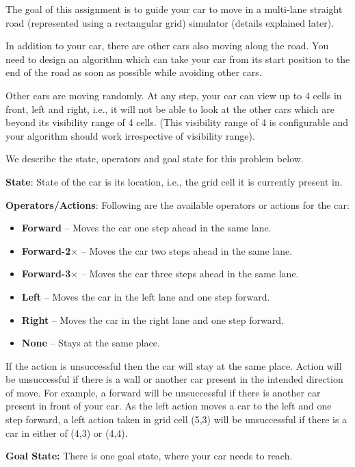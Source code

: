 \documentclass[12pt, letterpaper]{article}
\begin{document}
The goal of this assignment is to guide your car to move in a multi-lane straight road (represented using a rectangular grid) simulator (details explained later). 

In addition to your car, there are other cars also moving along the road. You need to design an algorithm which can take your car from its start position to the end of the road as soon as possible while avoiding other cars. 

Other cars are moving randomly. At any step, your car can view up to 4 cells in front, left and right, i.e., it will not be able to look at the other cars which are beyond its visibility range of 4 cells. (This visibility range of 4 is configurable and your algorithm should work irrespective of visibility range).

We describe the state, operators and goal state for this problem below.

\textbf{State}: State of the car is its location, i.e., the grid cell it is currently present in. 

\textbf{Operators/Actions}: Following are the available operators or actions for the car:

\begin{itemize}
    \item \textbf{Forward} – Moves the car one step ahead in the same lane.
    \item \textbf{Forward-2$\times$} – Moves the car two steps ahead in the same lane.
    \item \textbf{Forward-3$\times$} – Moves the car three steps ahead in the same lane.
    \item \textbf{Left} – Moves the car in the left lane and one step forward.
    \item \textbf{Right} – Moves the car in the right lane and one step forward.
    \item \textbf{None} – Stays at the same place.
\end{itemize}

If the action is unsuccessful then the car will stay at the same place. Action will be unsuccessful if there is a wall or another car present in the intended direction of move. For example, a forward will be unsuccessful if there is another car present in front of your car.
As the left action moves a car to the left and one step forward, a left action taken in grid cell (5,3) will be unsuccessful if there is a car in either of (4,3) or (4,4).

\textbf{Goal State:} There is one goal state, where your car needs to reach.
\end{document}
